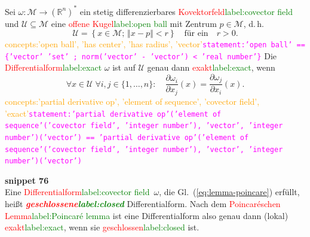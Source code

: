 \documentclass[a4paper,twoside,english,ngerman,deutsch,german,sectrefs,envcountsame,envcountchap]{svmono}
\newcommand{\setref}[2]{\textcolor{red}{#1}\textcolor{green}{#2}}
\newcommand{\snippet}[1]{\textbf{snippet #1}\\}
\newcommand{\eqnote}[2]{\textcolor{orange}{#1}\textcolor{magenta}{\texttt{#2}}}
\begin{document}
\begin{lemma}
\label{lem:poincare}Sei
$\omega:\mathcal{M}\to({\mathbb{R}}^{n})^{*}$ ein stetig differenzierbares
\setref{Kovektorfeld}{label:covector field} und $\mathcal{U}\subseteq\mathcal{M}$ eine \setref{offene Kugel}{label:open ball}
mit Zentrum $p\in\mathcal{M}$, d.\,h.
\[
\mathcal{U}=\left\{ x\in\mathcal{M};\,\left\Vert x-p\right\Vert <r\right\} \quad\textrm{für ein}\quad r>0.
\]\eqnote{concepts:'open ball', 'has center', 'has radius', 'vector'}{statement:'open ball' == \{'vector' \in 'set' ; norm('vector' - 'vector') < 'real number'\}}
Die \setref{Differentialform}{label:exact} $\omega$ ist auf $\mathcal{U}$ genau dann \setref{exakt}{label:exact},
wenn
\begin{equation}
\forall x\in\mathcal{U}\;\forall i,j\in\{1,\ldots,n\}:\quad\frac{\partial\omega_{i}}{\partial x_{j}}(x)=\frac{\partial\omega_{j}}{\partial x_{i}}(x).\label{eq:lemma-poincare}
\end{equation}\eqnote{concepts:'partial derivative op', 'element of sequence', 'covector field', 'exact'}{statement:'partial derivative op'('element of sequence'('covector field', 'integer number'), 'vector', 'integer number')('vector') == 'partial derivative op'('element of sequence'('covector field', 'integer number'), 'vector', 'integer number')('vector')}
\end{lemma}

\snippet{76}
Eine \setref{Differentialform}{label:covector field}~$\omega$, die Gl.~(\ref{eq:lemma-poincare})
erfüllt, heißt \textbf{\em \setref{geschlossene}{label:closed}} Differentialform.
Nach dem \setref{Poincaréschen Lemma}{label:Poincaré lemma} ist eine Differentialform also genau
dann (lokal) \setref{exakt}{label:exact}, wenn sie \setref{geschlossen}{label:closed} ist.
\end{document}
